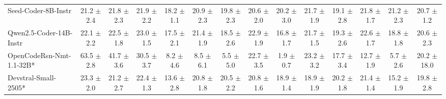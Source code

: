 \documentclass{llmxive}
\begin{document}
\begin{table}[hbt]
{\begin{tabular}{l *{13}{c}}




\rowcolor{gray!10}
Seed-Coder-8B-Instr 
 & 21.2 {\tiny$\pm$ 2.4} &
 21.8 {\tiny$\pm$ 2.3} &
 21.9 {\tiny$\pm$ 2.2} &
 18.2 {\tiny$\pm$ 1.1} &
 20.9 {\tiny$\pm$ 2.3} &
 19.8 {\tiny$\pm$ 2.3} &
 20.6 {\tiny$\pm$ 2.0} &
 20.2 {\tiny$\pm$ 3.0} &
 21.7 {\tiny$\pm$ 1.9} &
 19.1 {\tiny$\pm$ 2.8} &
 21.8 {\tiny$\pm$ 1.7} &
 21.2 {\tiny$\pm$ 2.3} &
 20.7 {\tiny$\pm$ 1.2} \\

 Qwen2.5-Coder-14B-Instr &
22.1 {\tiny$\pm$ 2.2} &
22.5 {\tiny$\pm$ 1.8} &
23.0 {\tiny$\pm$ 1.5} &
17.5 {\tiny$\pm$ 2.1} &
21.4 {\tiny$\pm$ 1.9} &
18.5 {\tiny$\pm$ 2.6} &
22.9 {\tiny$\pm$ 1.9} &
16.8 {\tiny$\pm$ 1.7} &
21.7 {\tiny$\pm$ 1.5} &
19.3 {\tiny$\pm$ 2.6} &
22.6 {\tiny$\pm$ 1.7} &
18.8 {\tiny$\pm$ 1.8} &
20.6 {\tiny$\pm$ 2.3} \\




\rowcolor{gray!10}
 OpenCodeRsn-Nmt-1.1-32B* &
63.5 {\tiny$\pm$ 2.8} &
41.7 {\tiny$\pm$ 3.6} &
30.5 {\tiny$\pm$ 3.7} &
8.2 {\tiny$\pm$ 4.6} &
8.5 {\tiny$\pm$ 6.1} &
5.5 {\tiny$\pm$ 5.0} &
22.7 {\tiny$\pm$ 3.5} &
1.9 {\tiny$\pm$ 0.7} &
23.2 {\tiny$\pm$ 3.2} &
17.7 {\tiny$\pm$ 3.4} &
12.7 {\tiny$\pm$ 1.9} &
5.7 {\tiny$\pm$ 2.6} &
20.2 {\tiny$\pm$ 18.0} \\


Devstral-Small-2505* &
23.3 {\tiny$\pm$ 2.0} &
21.2 {\tiny$\pm$ 2.7} &
22.4 {\tiny$\pm$ 1.3} &
13.6 {\tiny$\pm$ 2.8} &
20.8 {\tiny$\pm$ 1.8} &
20.5 {\tiny$\pm$ 2.2} &
20.8 {\tiny$\pm$ 1.6} &
18.9 {\tiny$\pm$ 1.4} &
18.9 {\tiny$\pm$ 1.9} &
20.2 {\tiny$\pm$ 1.8} &
21.4 {\tiny$\pm$ 1.4} &
15.2 {\tiny$\pm$ 1.9} &
19.8 {\tiny$\pm$ 2.8} \\


\end{tabular}}
\end{table}
\end{document}

